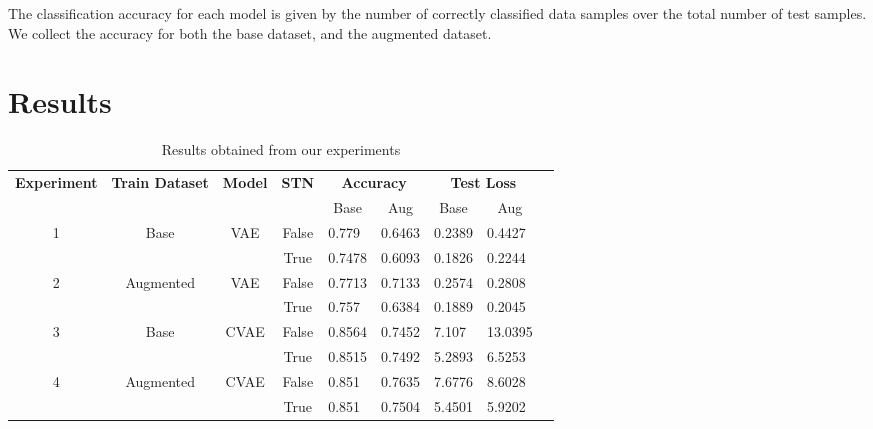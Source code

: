 \documentclass[twocolumn]{article}
\begin{document}
The classification accuracy for each model is given by the number of correctly classified data samples over the total number of test samples. We collect the accuracy for both the base dataset, and the augmented dataset. 

\section{Results}
    
\begin{table}[]
    \centering
    \begin{tabular}{@{}cccclllll@{}}
    \toprule
    \multicolumn{1}{c|}{\multirow{2}{*}{\textbf{Experiment}}} & 
    \multicolumn{1}{c|}{\multirow{2}{*}{\textbf{Train Dataset}}} & 
    \multicolumn{1}{c|}{\multirow{2}{*}{\textbf{Model}}} & 
    \multicolumn{1}{c|}{\multirow{2}{*}{\textbf{STN}}} & 
    \multicolumn{2}{c|}{\textbf{Accuracy}} & 
    \multicolumn{2}{c}{\textbf{Test Loss}} \\ 
    \cline{5-8}
    \multicolumn{1}{c|}{} & \multicolumn{1}{c|}{} & \multicolumn{1}{c|}{} & \multicolumn{1}{c|}{} & \multicolumn{1}{c|}{Base} & \multicolumn{1}{c|}{Aug} & \multicolumn{1}{c|}{Base} & \multicolumn{1}{c}{Aug} \\ \midrule
    \multirow{2}{*}{1} & \multirow{2}{*}{Base} & \multirow{2}{*}{VAE} & False & 0.779 & 0.6463 & 0.2389 & 0.4427 \\
     &  &  & True & 0.7478 & 0.6093 & 0.1826 & 0.2244 \\ \midrule
    \multirow{2}{*}{2} & \multirow{2}{*}{Augmented} & \multirow{2}{*}{VAE} & False & 0.7713 & 0.7133 & 0.2574 & 0.2808 \\
     &  &  & True & 0.757 & 0.6384 & 0.1889 & 0.2045 \\ \midrule
    \multirow{2}{*}{3} & \multirow{2}{*}{Base} & \multirow{2}{*}{CVAE} & False & 0.8564 & 0.7452 & 7.107 & 13.0395 \\
     &  &  & True & 0.8515 & 0.7492 & 5.2893 & 6.5253 \\ \midrule
    \multirow{2}{*}{4} & \multirow{2}{*}{Augmented} & \multirow{2}{*}{CVAE} & False & 0.851 & 0.7635 & 7.6776 & 8.6028 \\
     &  &  & True & 0.851 & 0.7504 & 5.4501 & 5.9202 \\ \bottomrule
    \end{tabular}
    \caption{Results obtained from our experiments}
    \label{tab:results}
\end{table}
\end{document}
